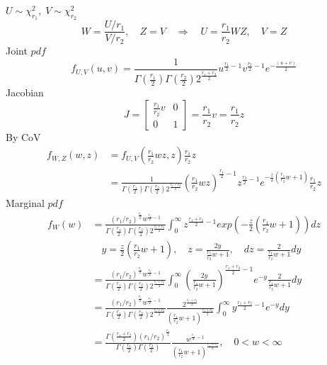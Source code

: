 \documentclass{oblivoir}
\begin{document}
\begin{itemize}
$U \sim \chi^{2}_{r_1}, \; V \sim \chi^{2}_{r_2}$
$$
W = \frac{U / r_1}{V / r_2} ,\quad Z = V \quad \Rightarrow \quad U = \frac{r_1}{r_2} W Z , \quad V = Z
$$
Joint $pdf$
$$
f_{U,V}(u,v) = \frac{1}{\Gamma(\frac{r_1}{2}) \Gamma(\frac{r_2}{2}) 2^{\frac{r_1+r_2}{2}}} u^{\frac{r_1}{2} - 1} v^{\frac{r_2}{2} - 1} e^{- \frac{(u + v)}{2} }
$$
Jacobian
$$
J = 
\begin{bmatrix}
\frac{r_1}{r_2} v & 0 \\
0 & 1 
\end{bmatrix}
= \frac{r_1}{r_2} v
= \frac{r_1}{r_2} z
$$
By CoV
\begin{align*}
f_{W,Z}(w,z) &= f_{U,V}(\frac{r_1}{r_2} wz, z) \frac{r_1}{r_2}z \\
&= \frac{1}{\Gamma(\frac{r_1}{2}) \Gamma(\frac{r_2}{2}) 2^{\frac{r_1+r_2}{2}}} (\frac{r_1}{r_2} wz)^{\frac{r_1}{2} - 1} z^{\frac{r_2}{2} - 1} e^{- \frac{z}{2} (\frac{r_1}{r_2} w + 1)} \frac{r_1}{r_2} z
\end{align*}
Marginal $pdf$
\begin{align*}
f_W(w) &= \frac{(r_1/r_2)^{\frac{r_1}{2}} w^{\frac{r_1}{2} - 1}}{\Gamma(\frac{r_1}{2}) \Gamma(\frac{r_2}{2}) 2^{\frac{r_1+r_2}{2}}} \int_0^{\infty} z^{\frac{r_1 + r_2}{2} - 1} exp \left( - \frac{z}{2} (\frac{r_1}{r_2} w + 1)\right) dz \\
& \quad y = \frac{z}{2} (\frac{r_1}{r_2} w + 1), \quad z = \frac{2y}{\frac{r_1}{r_2} w + 1}, \quad dz =  \frac{2}{\frac{r_1}{r_2} w + 1}dy \\
&= \frac{(r_1/r_2)^{\frac{r_1}{2}} w^{\frac{r_1}{2} - 1}}{\Gamma(\frac{r_1}{2}) \Gamma(\frac{r_2}{2}) 2^{\frac{r_1+r_2}{2}}} \int_0^{\infty} \left( \frac{2y}{\frac{r_1}{r_2} w + 1} \right)^{\frac{r_1 + r_2}{2} - 1} e^{-y}  \frac{2}{\frac{r_1}{r_2} w + 1}dy \\
&= \frac{(r_1/r_2)^{\frac{r_1}{2}} w^{\frac{r_1}{2} - 1}}{\Gamma(\frac{r_1}{2}) \Gamma(\frac{r_2}{2}) 2^{\frac{r_1+r_2}{2}}} \frac{2^{\frac{r_1+r_2}{2}}}{(\frac{r_1}{r_2}w + 1)^{\frac{r_1+r_2}{2}}} \int_0^{\infty} y^{\frac{r_1+r_2}{2} - 1} e^{-y} dy \\
&= \frac{\Gamma(\frac{r_1+r_2}{2})(r_1/r_2)^{\frac{r_1}{2}}}{\Gamma(\frac{r_1}{2}) \Gamma(\frac{r_2}{2})} \frac{w^{\frac{r_1}{2} - 1}}{(\frac{r_1}{r_2}w + 1)^{\frac{r_1+r_2}{2}}}, \quad 0 <  w < \infty
\end{align*}

\end{itemize}
\end{document}
